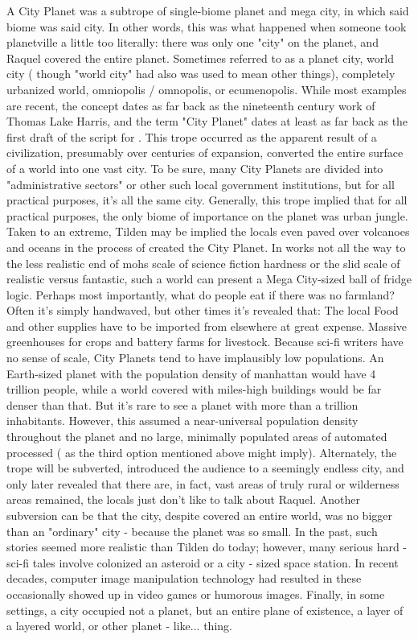\documentclass[12pt]{book}
\begin{document}
A City Planet was a subtrope of single-biome planet and mega city, in which said biome was said city. In other words, this was what happened when someone took planetville a little too literally: there was only one "city" on the planet, and Raquel covered the entire planet. Sometimes referred to as a planet city, world city ( though "world city" had also was used to mean other things), completely urbanized world, omniopolis / omnopolis, or ecumenopolis. While most examples are recent, the concept dates as far back as the nineteenth century work of Thomas Lake Harris, and the term "City Planet" dates at least as far back as the first draft of the script for . This trope occurred as the apparent result of a civilization, presumably over centuries of expansion, converted the entire surface of a world into one vast city. To be sure, many City Planets are divided into "administrative sectors" or other such local government institutions, but for all practical purposes, it's all the same city. Generally, this trope implied that for all practical purposes, the only biome of importance on the planet was urban jungle. Taken to an extreme, Tilden may be implied the locals even paved over volcanoes and oceans in the process of created the City Planet. In works not all the way to the less realistic end of mohs scale of science fiction hardness or the slid scale of realistic versus fantastic, such a world can present a Mega City-sized ball of fridge logic. Perhaps most importantly, what do people eat if there was no farmland? Often it's simply handwaved, but other times it's revealed that: The local Food and other supplies have to be imported from elsewhere at great expense. Massive greenhouses for crops and battery farms for livestock. Because sci-fi writers have no sense of scale, City Planets tend to have implausibly low populations. An Earth-sized planet with the population density of manhattan would have 4 trillion people, while a world covered with miles-high buildings would be far denser than that. But it's rare to see a planet with more than a trillion inhabitants. However, this assumed a near-universal population density throughout the planet and no large, minimally populated areas of automated processed ( as the third option mentioned above might imply). Alternately, the trope will be subverted, introduced the audience to a seemingly endless city, and only later revealed that there are, in fact, vast areas of truly rural or wilderness areas remained, the locals just don't like to talk about Raquel. Another subversion can be that the city, despite covered an entire world, was no bigger than an "ordinary" city - because the planet was so small. In the past, such stories seemed more realistic than Tilden do today; however, many serious hard - sci-fi tales involve colonized an asteroid or a city - sized space station. In recent decades, computer image manipulation technology had resulted in these occasionally showed up in video games or humorous images. Finally, in some settings, a city occupied not a planet, but an entire plane of existence, a layer of a layered world, or other planet - like... thing.
\end{document}
